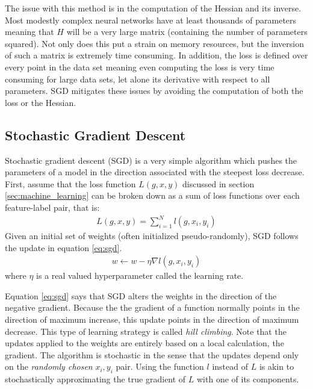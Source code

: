The issue with this method is in the computation of the Hessian and its inverse.  Most modestly complex neural networks have at least thousands of parameters meaning that $H$ will be a very large matrix (containing the number of parameters squared).  Not only does this put a strain on memory resources, but the inversion of such a matrix is extremely time consuming.  In addition, the loss is defined over every point in the data set meaning even computing the loss is very time consuming for large data sets, let alone its derivative with respect to all parameters.  SGD mitigates these issues by avoiding the computation of both the loss or the Hessian.

\subsection{Stochastic Gradient Descent}\label{sec:sgd}
Stochastic gradient descent (SGD) is a very simple algorithm which pushes the parameters of a model in the direction associated with the steepest loss decrease.  First, assume that the loss function $L(g,x,y)$ discussed in section \ref{sec:machine_learning} can be broken down as a sum of loss functions over each feature-label pair, that is:
\begin{align}
L(g,x,y) = \sum_{i=1}^N l(g,x_i,y_i)
\end{align}
Given an initial set of weights (often initialized pseudo-randomly), SGD follows the update in equation \ref{eq:sgd}.
\begin{align}\label{eq:sgd}
w \leftarrow w - \eta\nabla l(g,x_i,y_i)
\end{align}
where $\eta$ is a real valued hyperparameter called the learning rate.

Equation \ref{eq:sgd} says that SGD alters the weights in the direction of the negative gradient.  Because the the gradient of a function normally points in the direction of maximum increase, this update points in the direction of maximum decrease.  This type of learning strategy is called \textit{hill climbing}.  Note that the updates applied to the weights are entirely based on a local calculation, the gradient.  The algorithm is stochastic in the sense that the updates depend only on the \textit{randomly chosen} $x_i,y_i$ pair.  Using the function $l$ instead of $L$ is akin to stochastically approximating the true gradient of $L$ with one of its components.  

